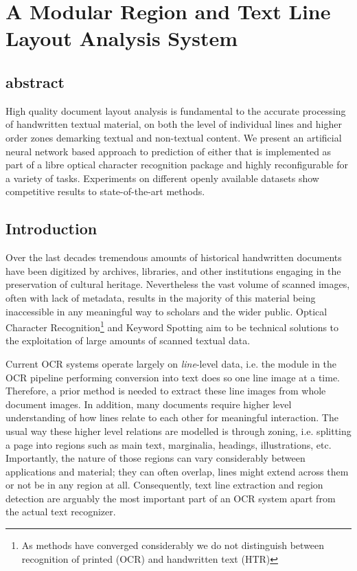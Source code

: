 \chapter{A Modular Region and Text Line Layout Analysis System}
\label{ch:icfhr}

\section{abstract}
High quality document layout analysis is fundamental to the accurate processing
of handwritten textual material, on both the level of individual lines and
higher order zones demarking textual and non-textual content. We present an
artificial neural network based approach to prediction of either that is
implemented as part of a libre optical character recognition package and highly
reconfigurable for a variety of tasks. Experiments on different openly
available datasets show competitive results to state-of-the-art methods.

\section{Introduction}

Over the last decades tremendous amounts of historical handwritten documents
have been digitized by archives, libraries, and other institutions engaging in
the preservation of cultural heritage. Nevertheless the vast volume of scanned
images, often with lack of metadata, results in the majority of this material
being inaccessible in any meaningful way to scholars and the wider public.
Optical Character Recognition\footnote{As methods have converged considerably
we do not distinguish between recognition of printed (OCR) and handwritten text
(HTR)} and Keyword Spotting aim to be technical solutions to the exploitation
of large amounts of scanned textual data. 

Current OCR systems operate largely on \emph{line}-level data, i.e. the module
in the OCR pipeline performing conversion into text does so one line image at a
time. Therefore, a prior method is needed to extract these line images from
whole document images. In addition, many documents require higher level
understanding of how lines relate to each other for meaningful interaction. The
usual way these higher level relations are modelled is through zoning, i.e.
splitting a page into regions such as main text, marginalia, headings,
illustrations, etc. Importantly, the nature of those regions can vary
considerably between applications and material; they can often overlap, lines
might extend across them or not be in any region at all. Consequently, text
line extraction and region detection are arguably the most important part of an
OCR system apart from the actual text recognizer.

